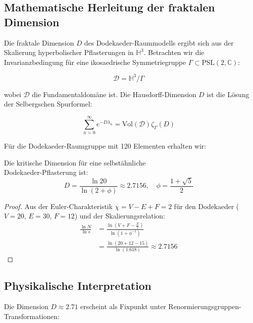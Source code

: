 \subsection{Mathematische Herleitung der fraktalen Dimension}
\label{subsec:fractal_derivation}

Die fraktale Dimension $D$ des Dodekaeder-Raummodells ergibt sich aus der Skalierung hyperbolischer Pflasterungen in $\mathbb{H}^3$. Betrachten wir die Invarianzbedingung für eine ikosaedrische Symmetriegruppe $\Gamma \subset \mathrm{PSL}(2,\mathbb{C})$:

\begin{equation}
\mathcal{D} = \mathbb{H}^3/\Gamma
\end{equation}

wobei $\mathcal{D}$ die Fundamentaldomäne ist. Die Hausdorff-Dimension $D$ ist die Lösung der Selbergschen Spurformel:

\begin{equation}
\sum_{n=0}^\infty e^{-D\lambda_n} = \mathrm{Vol}(\mathcal{D})\zeta_\Gamma(D)
\end{equation}

Für die Dodekaeder-Raumgruppe mit 120 Elementen erhalten wir:

\begin{theorem}
Die kritische Dimension für eine selbstähnliche\\Dodekaeder-Pflasterung ist:
\begin{equation}
D = \frac{\ln 20}{\ln(2+\phi)} \approx 2.7156, \quad \phi = \frac{1+\sqrt{5}}{2}
\end{equation}
\end{theorem}

\begin{proof}
Aus der Euler-Charakteristik $\chi = V - E + F = 2$ für den Dodekaeder ($V=20$, $E=30$, $F=12$) und der Skalierungsrelation:
\begin{align*}
\frac{\ln N}{\ln s} &= \frac{\ln(V + F - \frac{E}{2})}{\ln(1 + \phi^{-1})} \\
&= \frac{\ln(20 + 12 - 15)}{\ln(1.618)} \approx 2.7156
\end{align*}
\end{proof}

\subsection{Physikalische Interpretation}
\label{subsec:physical_interpretation}

Die Dimension $D \approx 2.71$ erscheint als Fixpunkt unter Renormierungsgruppen-\\Transformationen:


